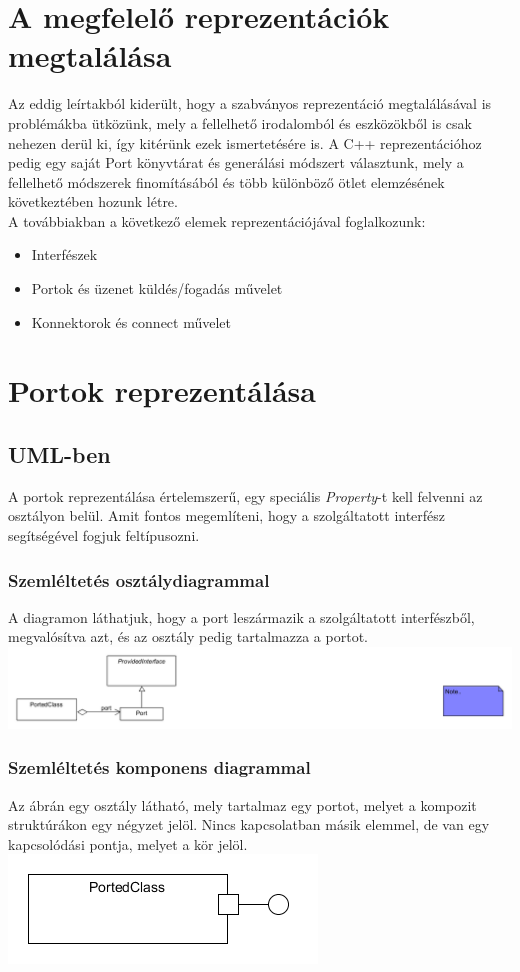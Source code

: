 \documentclass[a4paper,12pt]{report}
\begin{document}
\section{A megfelelő reprezentációk megtalálása}
Az eddig leírtakból kiderült, hogy a szabványos reprezentáció megtalálásával is problémákba ütközünk, mely a fellelhető irodalomból és eszközökből is csak nehezen derül ki, így kitérünk ezek ismertetésére is. A C++ reprezentációhoz pedig egy saját Port könyvtárat és generálási módszert választunk, mely a fellelhető módszerek finomításából és több különböző ötlet elemzésének következtében hozunk létre. \\

A továbbiakban a következő elemek reprezentációjával foglalkozunk:
\begin{itemize}
\item Interfészek
\item Portok és üzenet küldés/fogadás művelet
\item Konnektorok és connect művelet
\end{itemize}

\section{Portok reprezentálása}

\subsection{UML-ben}
A portok reprezentálása értelemszerű, egy speciális \textit{Property}-t kell felvenni az osztályon belül. Amit fontos megemlíteni, hogy a szolgáltatott interfész segítségével fogjuk feltípusozni. 


\subsubsection{Szemléltetés osztálydiagrammal}
A diagramon láthatjuk, hogy a port leszármazik a szolgáltatott interfészből, megvalósítva azt, és az osztály pedig tartalmazza a portot.
\includegraphics[scale=0.8]{uml_port_class.png}

\subsubsection{Szemléltetés komponens diagrammal}
Az ábrán egy osztály látható, mely tartalmaz egy portot, melyet a kompozit struktúrákon egy négyzet jelöl. Nincs kapcsolatban másik elemmel, de van egy kapcsolódási pontja, melyet a kör jelöl. \\
\includegraphics[scale=0.7]{uml_port_comp.png}
\end{document}

